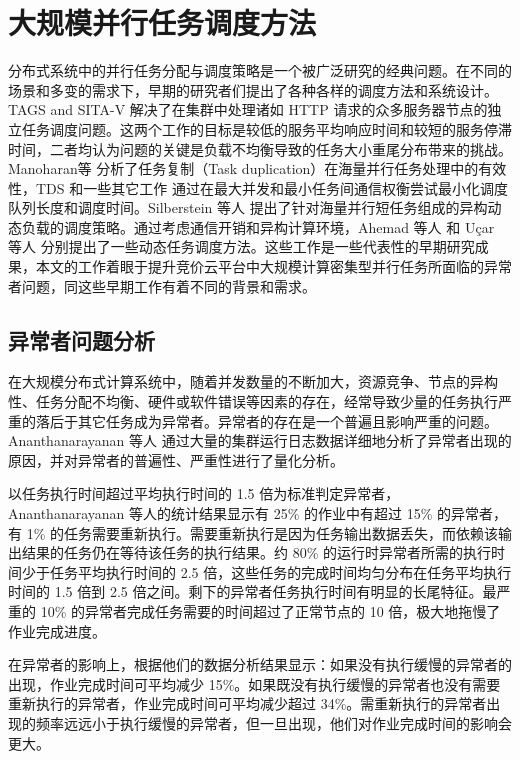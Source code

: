 \section{大规模并行任务调度方法}
分布式系统中的并行任务分配与调度策略是一个被广泛研究的经典问题。在不同的场景和多变的需求下，早期的研究者们提出了各种各样的调度方法和系统设计。TAGS \cite{balter} and SITA-V
\cite{Crovella:1998:TAD:277851.277942} 解决了在集群中处理诸如 HTTP 请求的众多服务器节点的独立任务调度问题。这两个工作的目标是较低的服务平均响应时间和较短的服务停滞时间，二者均认为问题的关键是负载不均衡导致的任务大小重尾分布带来的挑战。Manoharan等 \cite{Manoharan:2001:ETD:373047.373064} 分析了任务复制（Task duplication）在海量并行任务处理中的有效性，TDS \cite{rohtua} 和一些其它工作 \cite{ahmad, Dogan:2002:LDB:850943.853100} 通过在最大并发和最小任务间通信权衡尝试最小化调度队列长度和调度时间。Silberstein 等人 \cite{silberstein} 提出了针对海量并行短任务组成的异构动态负载的调度策略。通过考虑通信开销和异构计算环境，Ahemad 等人 \cite{Ahmad:1991:SLB:126283.126284} 和 Uçar 等人 \cite{ucar} 分别提出了一些动态任务调度方法。这些工作是一些代表性的早期研究成果，本文的工作着眼于提升竞价云平台中大规模计算密集型并行任务所面临的异常者问题，同这些早期工作有着不同的背景和需求。

\subsection{异常者问题分析}
在大规模分布式计算系统中，随着并发数量的不断加大，资源竞争、节点的异构性、任务分配不均衡、硬件或软件错误等因素的存在，经常导致少量的任务执行严重的落后于其它任务成为异常者。异常者的存在是一个普遍且影响严重的问题。Ananthanarayanan 等人 \cite{Ananthanarayanan:2010:ROM:1924943.1924962} 通过大量的集群运行日志数据详细地分析了异常者出现的原因，并对异常者的普遍性、严重性进行了量化分析。

以任务执行时间超过平均执行时间的 1.5 倍为标准判定异常者，Ananthanarayanan 等人的统计结果显示有 25\% 的作业中有超过 15\% 的异常者，有 1\% 的任务需要重新执行。需要重新执行是因为任务输出数据丢失，而依赖该输出结果的任务仍在等待该任务的执行结果。约 80\% 的运行时异常者所需的执行时间少于任务平均执行时间的 2.5 倍，这些任务的完成时间均匀分布在任务平均执行时间的 1.5 倍到 2.5 倍之间。剩下的异常者任务执行时间有明显的长尾特征。最严重的 10\% 的异常者完成任务需要的时间超过了正常节点的 10 倍，极大地拖慢了作业完成进度。

在异常者的影响上，根据他们的数据分析结果显示：如果没有执行缓慢的异常者的出现，作业完成时间可平均减少 15\%。如果既没有执行缓慢的异常者也没有需要重新执行的异常者，作业完成时间可平均减少超过 34\%。需重新执行的异常者出现的频率远远小于执行缓慢的异常者，但一旦出现，他们对作业完成时间的影响会更大。

